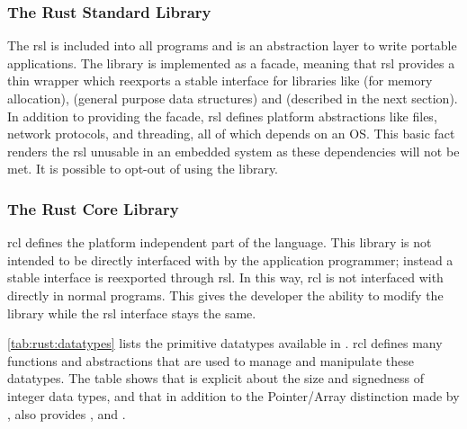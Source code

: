 \subsubsection{The Rust Standard Library}
\label{sec:rsl}

The \gls{rsl} is included into all {\rust} programs and is an abstraction layer to write portable applications.
The library is implemented as a facade, meaning that \gls{rsl} provides a thin wrapper which reexports a stable interface for libraries like  (for memory allocation),  (general purpose data structures) and {\core} (described in the next section).
In addition to providing the facade, \gls{rsl} defines platform abstractions like files, network protocols, and threading, all of which depends on an OS.
This basic fact renders the \gls{rsl} unusable in an embedded system as these dependencies will not be met.
It is possible to opt-out of using the library.

\subsubsection{The Rust Core Library}
\label{sec:rcl}

\gls{rcl} defines the platform independent part of the language.
This library is not intended to be directly interfaced with by the application programmer; instead a stable interface is reexported through \gls{rsl}.
In this way, \gls{rcl} is not interfaced with directly in normal {\rust} programs.
This gives the developer the ability to modify the library while the \gls{rsl} interface stays the same.

\autoref{tab:rust:datatypes} lists the primitive datatypes available in {\rust}.
\gls{rcl} defines many functions and abstractions that are used to manage and manipulate these datatypes.
The table shows that {\rust} is explicit about the size and signedness of integer data types, and that in addition to the Pointer/Array distinction made by {\C}, {\rust} also provides ,  and .

